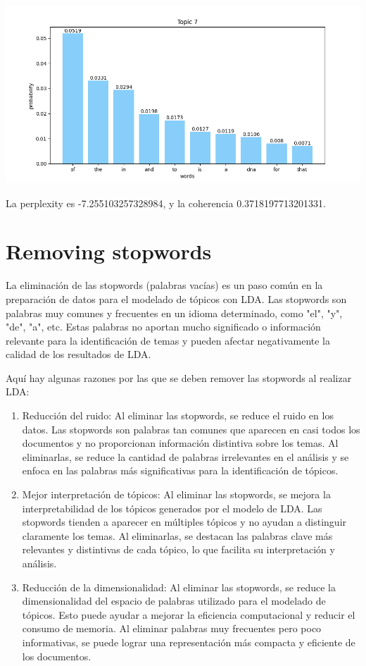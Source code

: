 \documentclass[10pt]{article} %
\begin{document}
\begin{center}
		\includegraphics[scale=0.6]{images/plots/test_8/topic_7.png}
	\end{center}

	La perplexity es -7.255103257328984, y la coherencia  0.3718197713201331.
	
	
	\section{Removing stopwords}
	
	La eliminación de las stopwords (palabras vacías) es un paso común en la preparación de datos para el modelado de tópicos con LDA. Las stopwords son palabras muy comunes y frecuentes en un idioma determinado, como "el", "y", "de", "a", etc. Estas palabras no aportan mucho significado o información relevante para la identificación de temas y pueden afectar negativamente la calidad de los resultados de LDA.
	
	Aquí hay algunas razones por las que se deben remover las stopwords al realizar LDA:
	\begin{enumerate}
		\item Reducción del ruido: Al eliminar las stopwords, se reduce el ruido en los datos. Las stopwords son palabras tan comunes que aparecen en casi todos los documentos y no proporcionan información distintiva sobre los temas. Al eliminarlas, se reduce la cantidad de palabras irrelevantes en el análisis y se enfoca en las palabras más significativas para la identificación de tópicos.
		
		\item 	Mejor interpretación de tópicos: Al eliminar las stopwords, se mejora la interpretabilidad de los tópicos generados por el modelo de LDA. Las stopwords tienden a aparecer en múltiples tópicos y no ayudan a distinguir claramente los temas. Al eliminarlas, se destacan las palabras clave más relevantes y distintivas de cada tópico, lo que facilita su interpretación y análisis.
		
		\item Reducción de la dimensionalidad: Al eliminar las stopwords, se reduce la dimensionalidad del espacio de palabras utilizado para el modelado de tópicos. Esto puede ayudar a mejorar la eficiencia computacional y reducir el consumo de memoria. Al eliminar palabras muy frecuentes pero poco informativas, se puede lograr una representación más compacta y eficiente de los documentos.
	\end{enumerate}
	
\end{document}
